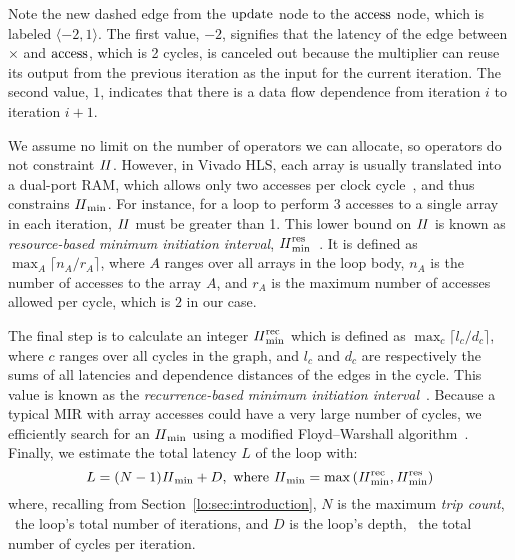 Note the new dashed edge from the $\operatorname{\mathrm{update}}$ node to the $\operatorname{\mathrm{access}}$ node,
which is labeled $\langle -2, 1 \rangle$.  The first value, $-2$, signifies
that the latency of the edge between $\times$ and $\operatorname{\mathrm{access}}$, which is 2
cycles, is canceled out because the multiplier can reuse its output from the
previous iteration as the input for the current iteration. The second value,
$1$, indicates that there is a data flow dependence from iteration $i$ to
iteration $i+1$.

We assume no limit on the number of operators we can allocate, so operators
do not constraint $\mathit{II}$.  However, in Vivado HLS, each array is usually
translated into a dual-port RAM, which allows only two accesses per clock
cycle~\cite{vivado_hls}, and thus constrains $\mathit{II}_{\rm min}$.  For instance, for a
loop to perform 3 accesses to a single array in each iteration, $\mathit{II}$ must be
greater than 1.  This lower bound on $\mathit{II}$ is known as \emph{resource-based
minimum initiation interval}, $\mathit{II}_{\rm min}^{\rm res}$~\cite{rau94}. It is defined as $\max_A
\lceil {n_A}/{r_A} \rceil$, where $A$ ranges over all arrays in the loop body,
$n_A$ is the number of accesses to the array $A$, and $r_A$ is the maximum
number of accesses allowed per cycle, which is $2$ in our case.

The final step is to calculate an integer $\mathit{II}_{\rm min}^{\rm rec}$ which is defined as
$\max_c \lceil {l_c}/{d_c} \rceil$, where $c$ ranges over all cycles in
the graph, and $l_c$ and $d_c$ are respectively the sums of all latencies
and dependence distances of the edges in the cycle. This value is known
as the \emph{recurrence-based minimum initiation interval}~\cite{rau94}.
Because a typical MIR with array accesses could have a very large number of
cycles, we efficiently search for an $\mathit{II}_{\rm min}$ using a modified Floyd--Warshall
algorithm~\cite{rau94}.  Finally, we estimate the total latency $L$ of the loop
with:
\begin{equation}
    L = (N - 1) \mathit{II}_{\rm min} + D,
    \text{~where~}
        \mathit{II}_{\rm min} = \max\left(\mathit{II}_{\rm min}^{\rm rec}, \mathit{II}_{\rm min}^{\rm res}\right)
    \nonumber
\end{equation}
where, recalling from Section~\ref{lo:sec:introduction}, $N$ is the maximum
\emph{trip count}, \ie~the loop's total number of iterations, and $D$ is the
loop's depth, \ie~the total number of cycles per iteration.

